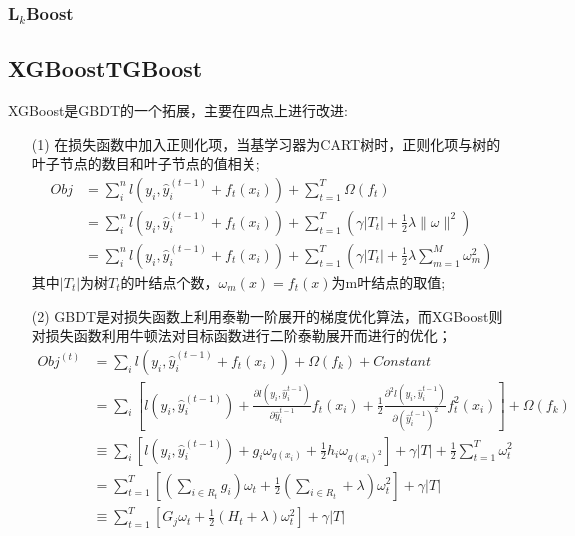\documentclass[a4paper]{article}
\begin{document}
		\subsubsection{L$_k$Boost}
	\subsection{XGBoost\quad TGBoost}
		XGBoost是GBDT的一个拓展，主要在四点上进行改进:
		\begin{itemize}
			\item[(1)] 在损失函数中加入正则化项，当基学习器为CART树时，正则化项与树的叶子节点的数目和叶子节点的值相关;
				\begin{align*}
					Obj & = \sum_{i}^{n}l(y_i, \hat{y}_i^{(t-1)}+f_t(x_i)) + \sum_{t=1}^{T}\Omega(f_t) \\
						& = \sum_{i}^{n}l(y_i, \hat{y}_i^{(t-1)}+f_t(x_i)) + \sum_{t=1}^{T}(\gamma |T_t|+\frac{1}{2}\lambda \|\omega\|^2)\\
						& = \sum_{i}^{n}l(y_i, \hat{y}_i^{(t-1)}+f_t(x_i)) + \sum_{t=1}^{T}(\gamma |T_t|+\frac{1}{2}\lambda \sum_{m=1}^{M}\omega_{m}^2)
				\end{align*}
					其中$|T_t|$为树$T_t$的叶结点个数，$\omega_m(x)=f_t(x)$为m叶结点的取值;
			\item[(2)] GBDT是对损失函数上利用泰勒一阶展开的梯度优化算法，而XGBoost则对损失函数利用牛顿法对目标函数进行二阶泰勒展开而进行的优化；
			\begin{align*}
				Obj^{(t)} & = \sum_{i}l(y_i, \hat{y}_i^{(t-1)}+f_t(x_i)) + \Omega(f_k) + Constant\\
						 & = \sum_{i}[l(y_i, \hat{y}_i^{(t-1)}) + \frac{\partial l(y_i, \hat{y}_{i}^{t-1})}{\partial \hat{y}_{i}^{t-1}}f_t(x_i) +
							\frac{1}{2}\frac{\partial^2 l(y_i, \hat{y}_{i}^{t-1})}{\partial (\hat{y}_{i}^{t-1})^2}f_t^2(x_i)] + \Omega(f_k)\\
						& \equiv \sum_{i}[l(y_i, \hat{y}_i^{(t-1)}) + g_i\omega_{q(x_i)}+\frac{1}{2}h_i\omega_{q(x_i)^2}]+
								\gamma|T|+\frac{1}{2}\sum_{t=1}^{T}\omega_t^{2}\\
						& = \sum_{t=1}^T[(\sum_{i\in R_t}g_i)\omega_t + \frac{1}{2}(\sum_{i\in R_t}+\lambda)\omega_t^2] + \gamma |T| \\
						& \equiv \sum_{t=1}^T[G_j\omega_t + \frac{1}{2}(H_t+\lambda)\omega_t^2] +\gamma |T|
			\end{align*}


\end{itemize}
\end{document}
